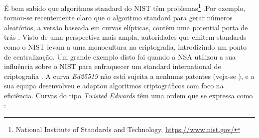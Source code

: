 \begin{enumerate}
É bem sabido que algoritmos standard do NIST têm problemas\footnote{\label{NIST_note}National Institute of Standards and Technology, \url{https://www.nist.gov/}} 
.\newline Por exemplo, tornou-se recentemente claro que o algoritmo standard para gerar números aleatórios, a versão baseada em curvas elípticas, contêm uma potential porta de trás \cite{hales2014nsa}. Visto de uma perspectiva mais ampla, autoridades que emitem standards como o NIST levam a uma monocultura na criptografia, introdizindo um ponto de centralização. Um grande exemplo disto foi quando a NSA utilizou a sua influência sobre o NIST para enfraquecer um standard international de criptografia \cite{NSA-NIST}.   
A curva {\em Ed25519} não está sujeita a nenhums patentes (veja-se \cite{ECC-patents}), e a sua equipa desenvolveu  e adaptou algoritmos criptográficos com foco na eficiência\cite{Bernstein2007}.
Curvas do tipo {\em Twisted Edwards} têm uma ordem que se expressa como :

\end{enumerate}
